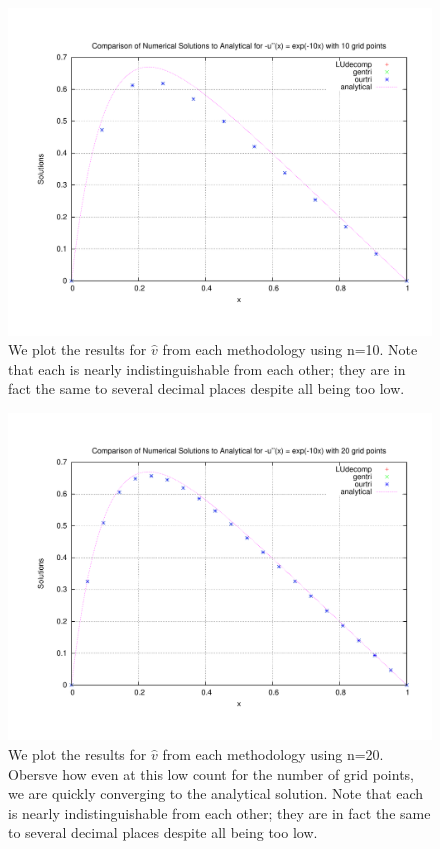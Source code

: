 \documentclass[11pt,a4paper]{article}
\begin{document}
\begin{figure}
\centering
\includegraphics[width=1.0\textwidth]{comparisonplot_10.pdf}
\caption{We plot the results for $\hat{v}$ from each methodology using n=10. Note that each is nearly indistinguishable from each other; they are in fact the same to several decimal places despite all being too low.}
\end{figure}
\begin{figure}
\centering
\includegraphics[width=1.0\textwidth]{comparisonplot_20.pdf}
\caption{We plot the results for $\hat{v}$ from each methodology using n=20. Obersve how even at this low count for the number of grid points, we are quickly converging to the analytical solution. Note that each is nearly indistinguishable from each other; they are in fact the same to several decimal places despite all being too low.}
\end{figure}
\end{document}
